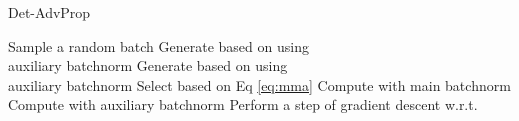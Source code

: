 \documentclass[final]{cvpr}
\begin{document}
\begin{algorithm}[!t]
\caption{Det-AdvProp}
\begin{algorithmic}[1]
\STATE Sample a random batch 
\STATE Generate  based on  using \\ auxiliary batchnorm
\STATE Generate  based on  using \\ auxiliary batchnorm
\STATE Select  based on Eq \eqref{eq:mma}
\STATE Compute  with main batchnorm
\STATE Compute  with auxiliary batchnorm
\STATE Perform a step of gradient descent w.r.t.  \\ 

\ENDFOR
\end{algorithmic}
\label{alg:schema}
\end{algorithm}
\end{document}
